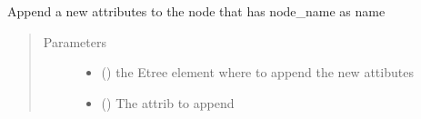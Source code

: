 \documentclass[a4paper,10pt,english]{sphinxmanual}
\begin{document}
\begin{fulllineitems}
\label{\detokenize{commands/apidoc/src:src.xmlManager.append_node_attrib}}
Append a new attributes to the node that has node\_name as name
\begin{quote}\begin{description}
\item[{Parameters}] \leavevmode\begin{itemize}
\item {} 
 () \textendash{} the Etree element 
where to append the new attibutes

\item {} 
 () \textendash{} The attrib to append

\end{itemize}

\end{description}\end{quote}

\end{fulllineitems}

\end{document}
